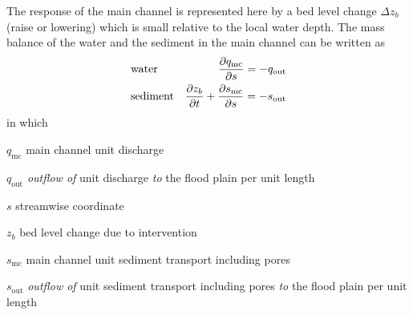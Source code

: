 The response of the main channel is represented here by a bed level change $\Delta z_b$ \unitbrackets{\SI{}{\metre}} (raise or lowering) which is small relative to the local water depth.
The mass balance of the water and the sediment in the main channel can be written as
%
\begin{align}
&\text{water} & \pdiff{q_\text{mc}}{s} = -q_\text{out} \label{Eq2} \\
&\text{sediment} & \pdiff{z_b}{t} + \pdiff{s_\text{mc}}{s} = -s_\text{out} \label{Eq3}
\end{align}
%
in which
%
\begin{symbollist}
\item[$q_\text{mc}$] main channel unit discharge \unitbrackets{\SI{}{\metre\squared\per\second}}
\item[$q_\text{out}$] \emph{outflow of} unit discharge \emph{to} the flood plain per unit length \unitbrackets{\SI{}{\metre\squared\per\second\per\meter}}
\item[$s$] streamwise coordinate \unitbrackets{\SI{}{\metre}}
\item[$z_b$] bed level change due to intervention \unitbrackets{\SI{}{\metre}}
\item[$s_\text{mc}$] main channel unit sediment transport including pores \unitbrackets{\SI{}{\metre\squared\per\second}}
\item[$s_\text{out}$] \emph{outflow of} unit sediment transport including pores \emph{to} the flood plain per unit length \unitbrackets{\SI{}{\metre\squared\per\second\per\metre}}
\end{symbollist}

